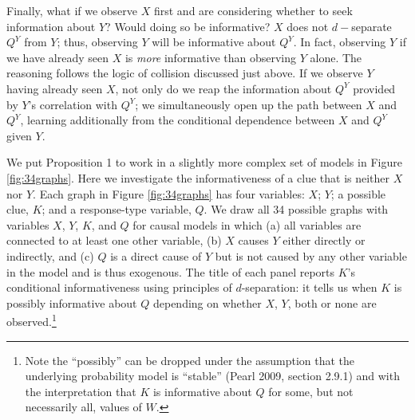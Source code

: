 \documentclass[12pt,]{book}
\let\rmarkdownfootnote\footnote%
\def\footnote{\protect\rmarkdownfootnote}
\begin{document}
Finally, what if we observe \(X\) first and are considering whether to seek information about \(Y\)? Would doing so be informative? \(X\) does not \(d-\)separate \(Q^Y\) from \(Y\); thus, observing \(Y\) will be informative about \(Q^Y\). In fact, observing \(Y\) if we have already seen \(X\) is \emph{more} informative than observing \(Y\) alone. The reasoning follows the logic of collision discussed just above. If we observe \(Y\) having already seen \(X\), not only do we reap the information about \(Q^Y\) provided by \(Y\)'s correlation with \(Q^Y\); we simultaneously open up the path between \(X\) and \(Q^Y\), learning additionally from the conditional dependence between \(X\) and \(Q^Y\) given \(Y\).

We put Proposition 1 to work in a slightly more complex set of models in Figure \ref{fig:34graphs}. Here we investigate the informativeness of a clue that is neither \(X\) nor \(Y\). Each graph in Figure \ref{fig:34graphs} has four variables: \(X\); \(Y\); a possible clue, \(K\); and a response-type variable, \(Q\). We draw all 34 possible graphs with variables \(X\), \(Y\), \(K\), and \(Q\) for causal models in which (a) all variables are connected to at least one other variable, (b) \(X\) causes \(Y\) either directly or indirectly, and (c) \(Q\) is a direct cause of \(Y\) but is not caused by any other variable in the model and is thus exogenous. The title of each panel reports \(K\)'s conditional informativeness using principles of \(d\)-separation: it tells us when \(K\) is possibly informative about \(Q\) depending on whether \(X\), \(Y\), both or none are observed.\footnote{Note the ``possibly'' can be dropped under the assumption that the underlying probability model is ``stable'' (Pearl 2009, section 2.9.1) and with the interpretation that \(K\) is informative about \(Q\) for some, but not necessarily all, values of \(W\).}
\end{document}
